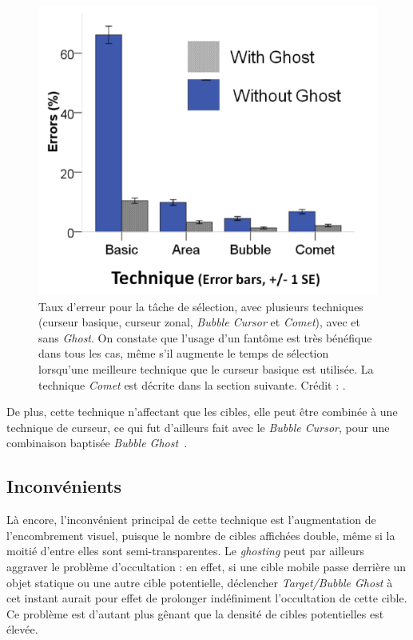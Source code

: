	\begin{figure}[H]
		\centering
		\includegraphics[width=\textwidth]{figures/ch2/cometGhostErrors}
		\caption[\emph{Comet/Ghost}, taux d'erreur]{Taux d'erreur pour la tâche de sélection, avec plusieurs techniques (curseur basique, curseur zonal, \emph{Bubble Cursor} et \emph{Comet}), avec et sans \emph{Ghost}. On constate que l'usage d'un fantôme est très bénéfique dans tous les cas, même s'il augmente le temps de sélection lorsqu'une meilleure technique que le curseur basique est utilisée. La technique \emph{Comet} est décrite dans la section suivante. Crédit : \cite{hasan2011comet}.}
		\label{fig:cometGhostErrors}
	\end{figure}
		
	De plus, cette technique n'affectant que les cibles, elle peut être combinée à une technique de curseur, ce qui fut d'ailleurs fait avec le \emph{Bubble Cursor}, pour une combinaison baptisée \emph{Bubble Ghost}~\cite{hasan2011comet}.
		
	\subsection{Inconvénients}
	Là encore, l'inconvénient principal de cette technique est l'augmentation de l'encombrement visuel, puisque le nombre de cibles affichées double, même si la moitié d'entre elles sont semi-transparentes. Le \emph{ghosting} peut par ailleurs aggraver le problème d'occultation : en effet, si une cible mobile passe derrière un objet statique ou une autre cible potentielle, déclencher \emph{Target/Bubble Ghost} à cet instant aurait pour effet de prolonger indéfiniment l'occultation de cette cible. Ce problème est d'autant plus gênant que la densité de cibles potentielles est élevée.
		
